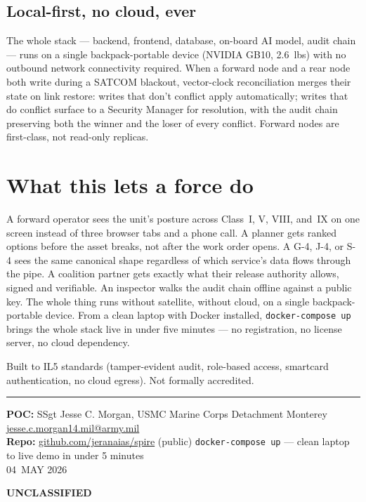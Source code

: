 \documentclass[10.5pt]{extarticle}
\newcommand{\classband}[0]{%
  \begin{center}\textbf{UNCLASSIFIED}\end{center}%
}
\begin{document}
\subsection*{Local-first, no cloud, ever}
The whole stack --- backend, frontend, database, on-board AI model,
audit chain --- runs on a single backpack-portable device (NVIDIA GB10, 2.6~lbs) with no outbound
network connectivity required. When a forward node and a rear node
both write during a SATCOM blackout, vector-clock reconciliation
merges their state on link restore: writes that don't conflict apply
automatically; writes that do conflict surface to a Security Manager
for resolution, with the audit chain preserving both the winner and
the loser of every conflict. Forward nodes are first-class, not
read-only replicas.

\section*{What this lets a force do}
A forward operator sees the unit's posture across Class~I, V, VIII,
and~IX on one screen instead of three browser tabs and a phone call.
A planner gets ranked options before the asset breaks, not after the
work order opens. A G-4, J-4, or S-4 sees the same canonical shape
regardless of which service's data flows through the pipe. A coalition
partner gets exactly what their release authority allows, signed and
verifiable. An inspector walks the audit chain offline against a
public key. The whole thing runs without satellite, without cloud, on
a single backpack-portable device. From a clean laptop with Docker installed,
\texttt{docker-compose up} brings the whole stack live in under five
minutes --- no registration, no license server, no cloud dependency.

Built to IL5 standards (tamper-evident audit, role-based access,
smartcard authentication, no cloud egress). Not formally accredited.

\vfill

\noindent\rule{\linewidth}{0.4pt}

\begin{center}
{\fontsize{9.5pt}{11pt}\selectfont
\textbf{POC:} SSgt Jesse C. Morgan, USMC {\textperiodcentered} Marine Corps Detachment Monterey {\textperiodcentered} \href{mailto:jesse.c.morgan14.mil@army.mil}{jesse.c.morgan14.mil@army.mil}\\
\textbf{Repo:} \href{https://github.com/jeranaias/spire}{github.com/jeranaias/spire} (public) {\textperiodcentered} \texttt{docker-compose up} --- clean laptop to live demo in under 5 minutes\\[3pt]
{\color{spireMuted}04~MAY 2026}
}
\end{center}

\classband
\end{document}
